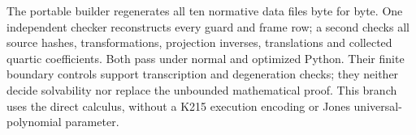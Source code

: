 The portable builder regenerates all ten normative data files byte for
byte.  One independent checker reconstructs every guard and frame row;
a second checks all source hashes, transformations, projection inverses,
translations and collected quartic coefficients.  Both pass under normal
and optimized Python.  Their finite boundary controls support transcription
and degeneration checks; they neither decide solvability nor replace the
unbounded mathematical proof.  This branch uses the direct calculus,
without a K215 execution encoding or Jones universal-polynomial parameter.
